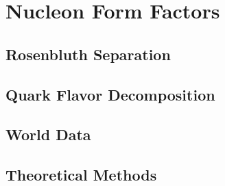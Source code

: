 \section{Nucleon Form Factors}

\subsection{Rosenbluth Separation}

\subsection{Quark Flavor Decomposition}

\subsection{World Data}

\subsection{Theoretical Methods}